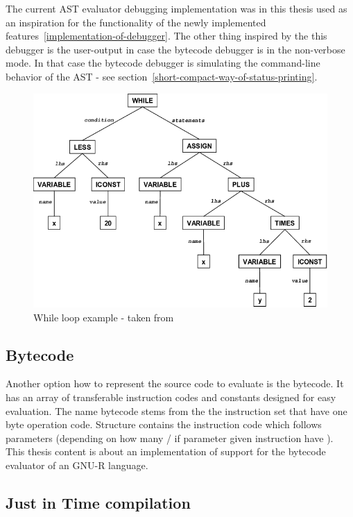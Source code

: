 \documentclass[thesis=M,english]{FITthesis}[2018/10/20]
\begin{document}
The current AST evaluator debugging implementation was in this thesis used as an inspiration for the functionality of the newly implemented features~\ref{implementation-of-debugger}. The other thing inspired by the this debugger is the user-output in case the bytecode debugger is in the non-verbose mode. In that case the bytecode debugger is simulating the command-line behavior of the AST - see section~\ref{short-compact-way-of-status-printing}.


\begin{figure}[H]\centering
	\includegraphics{Abstract-syntax-tree-of-the-while-loop}
	\caption{While loop example - taken from~\cite{WHILE_LOOP_EXAMPLE}}\label{fig:ast-while}
\end{figure}

\subsection{Bytecode}\label{BC}

Another option how to represent the source code to evaluate is the bytecode. It has an array of transferable instruction codes and constants designed for easy evaluation. The name bytecode stems from the the instruction set that have one byte operation code. Structure contains the instruction code which follows parameters (depending on how many / if parameter given instruction have ). This thesis content is about an implementation of support for the bytecode evaluator of an GNU-R language.

\subsection{Just in Time compilation}\label{JIT}
\end{document}

